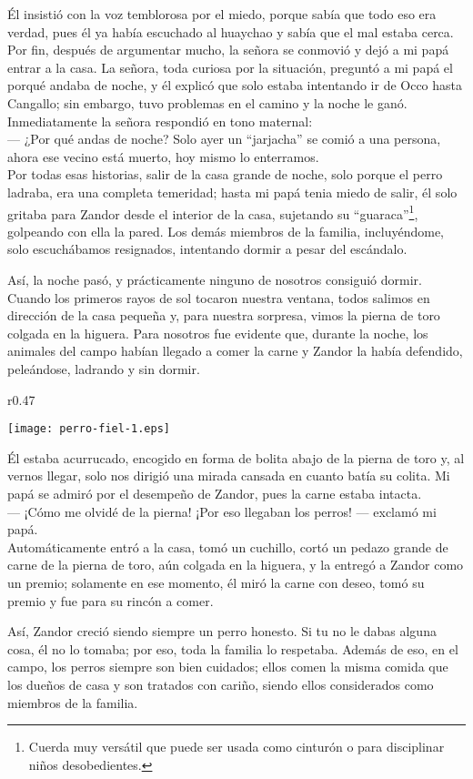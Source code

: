 Él insistió con la voz temblorosa por el miedo, porque sabía que todo eso era verdad, pues él ya había escuchado al huaychao y sabía que el mal estaba cerca. Por fin, después de argumentar mucho, la señora se conmovió y dejó a mi papá entrar a la casa.
La señora, toda curiosa por la situación, preguntó a mi papá el porqué andaba de noche, y él explicó que solo estaba intentando ir de Occo hasta Cangallo; sin embargo, tuvo problemas en el camino y la noche le ganó. 
Inmediatamente la señora respondió en tono maternal:\\\indent 
--- ¿Por qué andas de noche? Solo ayer un ``jarjacha'' se comió a una persona, ahora ese vecino está muerto, hoy mismo lo enterramos.\\\indent
Por todas esas historias, salir de la casa grande de noche, solo porque el perro ladraba, era una completa temeridad; hasta mi papá tenia miedo de salir, él solo gritaba para Zandor desde el interior de la casa, sujetando su ``guaraca''\footnote{Cuerda muy versátil que puede ser usada como cinturón o para disciplinar niños desobedientes.}, golpeando con ella la pared.
Los demás miembros de la familia, incluyéndome, solo escuchábamos resignados, intentando dormir a pesar del escándalo.

Así, la noche pasó, y prácticamente ninguno de nosotros consiguió dormir. 
Cuando los primeros rayos de sol tocaron nuestra ventana, todos salimos en dirección de la casa pequeña y, para nuestra sorpresa, vimos la pierna de toro colgada en la higuera. 
Para nosotros fue evidente que, durante la noche, los animales del campo habían llegado a comer la carne y Zandor la había defendido, peleándose, ladrando y sin dormir. 
\ifdefined\EnableIncludeImages
\begin{wrapfigure}{r}{0.47\textwidth}
  \begin{center}
  \vspace{-0.5cm}
    \texttt{[image: perro-fiel-1.eps]}
  \end{center}
  \vspace{-0.5cm}
\end{wrapfigure}
\fi
Él estaba acurrucado, encogido en forma de bolita abajo de la pierna de toro y, al vernos llegar, solo nos dirigió una mirada cansada en cuanto batía su colita. Mi papá se admiró por el desempeño de Zandor, pues la carne estaba intacta.\\\indent
--- ¡Cómo me olvidé de la pierna! ¡Por eso llegaban los perros! --- exclamó mi papá.\\\indent
Automáticamente entró a la casa, tomó un cuchillo, cortó un pedazo grande de carne de la pierna de toro, aún colgada en la higuera, y la entregó a Zandor como un premio; solamente en ese momento, él miró la carne con deseo, tomó su premio y fue para su rincón a comer.

Así, Zandor creció siendo siempre un perro honesto. Si tu no le dabas alguna cosa, él no lo tomaba; por eso, toda la familia lo respetaba. Además de eso, en el campo, los perros siempre son bien cuidados; ellos comen la misma comida que los dueños de casa y son tratados con cariño, siendo ellos considerados como miembros de la familia.


